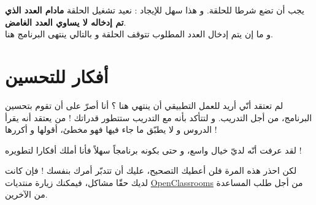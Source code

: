 يجب أن تضع شرطا للحلقة. و هذا سهل للإيجاد : نعيد تشغيل الحلقة 
\textbf{مادام العدد الذي تم إدخاله لا يساوي العدد الغامض}.\\
و ما إن يتم إدخال العدد المطلوب تتوقف الحلقة و بالتالي ينتهى البرنامج هنا.

\section{أفكار للتحسين}

لم تعتقد أنّي أريد للعمل التطبيقي أن ينتهي هنا ؟ أنا أصرّ على أن تقوم بتحسين البرنامج، من أجل التدريب. و لتتأكد بأنه مع التدريب ستتطور قدراتك ! من يعتقد أنه يقرأ الدروس و لا يطبّق ما جاء فيها فهو مخطئ، أقولها و أكررها !

لقد عرفت أنّه لديّ خيال واسع، و حتى بكونه برنامجاً سهلاً فأنا أملك أفكارا لتطويره !

لكن احذر هذه المرة فلن أعطيك التصحيح، عليك أن تتدبّر أمرك بنفسك ! فإن كانت لديك حقّا مشاكل، فيمكنك زيارة منتديات 
\href{http://www.siteduzero.com/forum-81-126-langage-c.html}{\textenglish{OpenClassrooms}}
من أجل طلب المساعدة من الآخرين.

